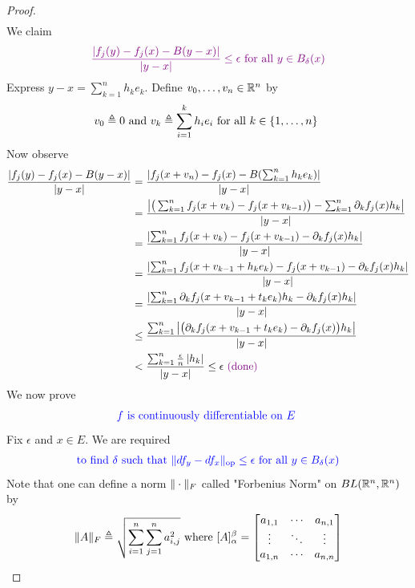 \documentclass{report}
\begin{document}
\begin{proof}
\begin{align*}
\end{align*}
We claim 
\begin{align*}
  \textcolor{violet}{\frac{\left|f_j(y)-f_j(x)-B(y-x)\right|}{\left|y-x\right|}\leq \epsilon \text{ for all }y \in B_\delta (x)}
\end{align*}
Express $y-x=\sum_{k=1}^n h_ke_k$. Define $v_0,\dots,v_n\in\mathbb{R}^n$ by
\begin{align*}
v_0\triangleq 0\text{ and }v_k\triangleq \sum_{i=1}^k h_ie_i\text{ for all $k\in \{ 1,\dots ,n \}$ }
\end{align*}
Now observe
\begin{align*}
\frac{\left|f_j(y)-f_j(x)-B(y-x)\right|}{\left|y-x\right|}&=\frac{\left|f_j(x+v_n)-f_j(x)-B(\sum_{k=1}^n h_ke_k)\right|}{\left|y-x\right|}\\
&=\frac{\left|\big(\sum_{k=1}^nf_j(x+v_k)-f_j(x+v_{k-1}) \big)- \sum_{k=1}^n \partial_k f_j(x)h_k   \right|}{\left|y-x\right|}\\
&=\frac{\left|\sum_{k=1}^n f_j(x+v_k)-f_j(x+v_{k-1})-\partial_k f_j(x)h_k\right|}{\left|y-x\right|}\\
&=\frac{\left|\sum_{k=1}^n f_j(x+v_{k-1}+h_ke_k)-f_j(x+v_{k-1})-\partial_k f_j(x)h_k\right|}{\left|y-x\right|}\\
&=\frac{\left|\sum_{k=1}^n \partial_k f_j(x+v_{k-1}+t_ke_k)h_k-\partial_k f_j(x)h_k\right|}{\left|y-x\right|}\\
&\leq \frac{\sum_{k=1}^n \left|\big(\partial_k f_j(x+v_{k-1}+t_ke_k)-\partial_k f_j(x) \big)h_k\right|}{\left|y-x\right|}\\
&< \frac{\sum_{k=1}^n \frac{\epsilon }{n} \left|h_k\right|}{\left|y-x\right|}\leq \epsilon \textcolor{violet}{\text{ (done) }}
\end{align*}
We now prove
\begin{align*}
\textcolor{blue}{f\text{ is continuously differentiable on $E$ }}
\end{align*}
Fix $\epsilon $ and $x\in E$. We are required 
\begin{align*}
\textcolor{blue}{\text{ to find $\delta$ such that $\| df_y-df_x \|_\text{op}\leq \epsilon $ for all $y\in B_\delta (x)$ }}
\end{align*}
Note that one can define a norm $\| \cdot \|_F$ called "Forbenius Norm" on $BL(\mathbb{R}^n,\mathbb{R}^n)$ by 
\begin{align*}
\norm{A}_F\triangleq \sqrt{\sum_{i=1}^n \sum_{j=1}^n a_{i,j}^2}  \text{ where }[A]_\alpha ^\beta = \begin{bmatrix}
  a_{1,1}& \cdots & a_{n,1}\\
  \vdots & \ddots & \vdots \\
  a_{1,n} & \cdots & a_{n,n}  
\end{bmatrix}

\end{align*}
\end{proof}
\end{document}

